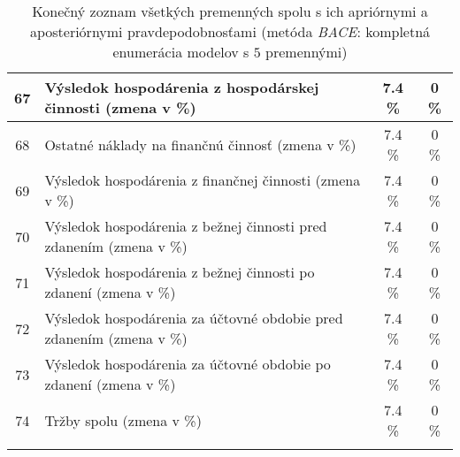 \begin{longtable}{ |c|p{7cm}|c|c| }
        \hline
        67 & Výsledok hospodárenia z hospodárskej činnosti (zmena v \%) & 7.4 \% & 0 \% \\
        \hline
        68 & Ostatné náklady na finančnú činnosť (zmena v \%) & 7.4 \% & 0 \% \\
        \hline
        69 & Výsledok hospodárenia z finančnej činnosti (zmena v \%) & 7.4 \% & 0 \% \\
        \hline
        70 & Výsledok hospodárenia z bežnej činnosti pred zdanením (zmena v \%) & 7.4 \% & 0 \% \\
        \hline
        71 & Výsledok hospodárenia z bežnej činnosti po zdanení (zmena v \%) & 7.4 \% & 0 \% \\
        \hline
        72 & Výsledok hospodárenia za účtovné obdobie pred zdanením (zmena v \%) & 7.4 \% & 0 \% \\
        \hline
        73 & Výsledok hospodárenia za účtovné obdobie po zdanení (zmena v \%) & 7.4 \% & 0 \% \\
        \hline
        74 & Tržby spolu (zmena v \%) & 7.4 \% & 0 \% \\
        \hline
    \caption{Konečný zoznam všetkých premenných spolu s ich apriórnymi a aposteriórnymi pravdepodobnosťami (metóda \emph{BACE}: kompletná enumerácia modelov s \(5\) premennými)}
    \label{bace1_pp}
\end{longtable}